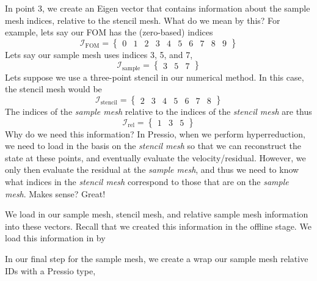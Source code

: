 In point 3, we create an Eigen vector that contains information about the sample mesh indices, relative to the stencil mesh. What do we mean by this? For example, let\textquotesingle{}s say our F\+OM has the (zero-\/based) indices \[ \mathcal{I}_{\text{FOM}} = \begin{Bmatrix} 0& 1 & 2 & 3 & 4 & 5 & 6 & 7 & 8 & 9 \end{Bmatrix}\] Let\textquotesingle{}s say our sample mesh uses indices 3, 5, and 7, \[ \mathcal{I}_{\text{sample}} = \begin{Bmatrix} 3 & 5 & 7 \end{Bmatrix}\] Let\textquotesingle{}s suppose we use a three-\/point stencil in our numerical method. In this case, the stencil mesh would be \[ \mathcal{I}_{\text{stencil}} = \begin{Bmatrix} 2& 3 & 4& 5 &6 & 7 & 8\end{Bmatrix}\] The indices of the {\itshape sample mesh} relative to the indices of the {\itshape stencil mesh} are thus \[ \mathcal{I}_{\text{rel}} =\begin{Bmatrix} 1 & 3 & 5 \end{Bmatrix}\] Why do we need this information? In Pressio, when we perform hyperreduction, we need to load in the basis on the {\itshape stencil mesh} so that we can reconstruct the state at these points, and eventually evaluate the velocity/residual. However, we only then evaluate the residual at the {\itshape sample mesh}, and thus we need to know what indices in the {\itshape stencil mesh} correspond to those that are on the {\itshape sample mesh}. Makes sense? Great!

We load in our sample mesh, stencil mesh, and relative sample mesh information into these vectors. Recall that we created this information in the offline stage. We load this information in by 
\begin{DoxyCode}{0}
\end{DoxyCode}


In our final step for the sample mesh, we create a wrap our sample mesh relative I\+Ds with a Pressio type, 
\begin{DoxyCode}{0}
\end{DoxyCode}


